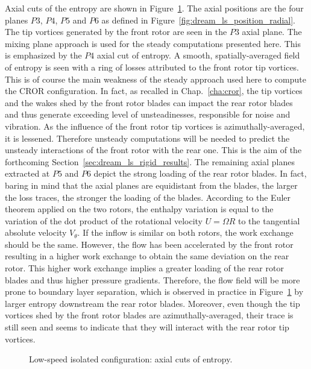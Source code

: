 Axial cuts of the entropy are shown in Figure~\ref{fig:dream_ls_steady_entropy}.
The axial positions are the four planes $P3$, $P4$, $P5$
and $P6$ as defined in Figure~\ref{fig:dream_ls_position_radial}.
The tip vortices generated by the front rotor are seen in the $P3$
axial plane. The mixing plane approach is used for the steady computations
presented here. This is emphasized by the $P4$ axial cut of entropy. A
smooth, spatially-averaged field of entropy is seen with a 
ring of losses attributed to the front rotor tip vortices. This is of course the main
weakness of the steady approach used here to compute the CROR configuration.
In fact, as recalled in Chap.~\ref{cha:cror}, the tip vortices and the wakes shed by the
front rotor blades can impact the rear rotor blades and thus generate
exceeding level of unsteadinesses, responsible for noise and vibration. As the influence
of the front rotor tip vortices is azimuthally-averaged, it is
lessened. Therefore unsteady computations will be needed to
predict the unsteady interactions of the front rotor with the rear one.
This is the aim of the forthcoming Section~\ref{sec:dream_ls_rigid_results}.
The remaining axial planes extracted at $P5$ and $P6$ depict the strong loading
of the rear rotor blades. In fact, baring in mind that the
axial planes are equidistant from the blades, the larger the loss traces,
the stronger the loading of the blades. 
According to the Euler theorem applied on the two
rotors, the enthalpy variation is equal to the variation of 
the dot product of the rotational 
velocity $U=\Omega R$ to the tangential absolute velocity
$V_\theta$. If the inflow is similar on both rotors,
the work exchange should be the same. However,
the flow has been accelerated by the front rotor
resulting in a higher work exchange to obtain
the same deviation on the rear rotor.
This higher work exchange implies 
a greater loading of the rear rotor blades and thus
higher pressure gradients. Therefore,
the flow field will be more prone to boundary layer
separation, which is observed in practice in 
Figure~\ref{fig:dream_ls_steady_entropy} by larger entropy
downstream the rear rotor blades.
Moreover, even though the
tip vortices shed by the front rotor 
blades are azimuthally-averaged,
their trace is still seen and seems to indicate that they will
interact with the rear rotor tip vortices.
\begin{figure}[htp]
  \centering
  \caption{Low-speed isolated configuration: axial cuts of entropy.}
   \label{fig:dream_ls_steady_entropy}
\end{figure}